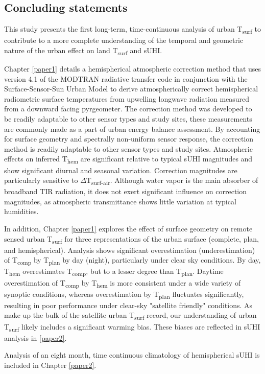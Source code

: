 \begin{bibunit}

\rhead{\thepage}

\chapter{Concluding statements}

This study presents the first long-term, time-continuous analysis of urban T\textsubscript{surf} to contribute to a more complete understanding of the temporal and geometric nature of the urban effect on land T\textsubscript{surf} and sUHI. 

Chapter \ref{paper1} details a hemispherical atmospheric correction method that uses version 4.1 of the MODTRAN radiative transfer code \citep{Berk1987} in conjunction with the Surface-Sensor-Sun Urban Model \citep{Soux2004} to derive atmospherically correct hemispherical radiometric surface temperatures from upwelling longwave radiation measured from a downward facing pyrgeometer. The correction method was developed to be readily adaptable to other sensor types and study sites, these measurements are commonly made as a part of urban energy balance assessment. By accounting for surface geometry and spectrally non-uniform sensor response, the correction method is readily adaptable to other sensor types and study sites. Atmospheric effects on inferred T\textsubscript{hem} are significant relative to typical sUHI magnitudes and show significant diurnal and seasonal variation. Correction magnitudes are particularly sensitive to $\Delta$T\textsubscript{surf-air}. Although water vapor is the main absorber of broadband TIR radiation, it does not exert significant influence on correction magnitudes, as atmospheric transmittance shows little variation at typical humidities. 

In addition, Chapter \ref{paper1} explores the effect of surface geometry on remote sensed urban T\textsubscript{surf} for three representations of the urban surface (complete, plan, and hemispherical). Analysis shows significant overestimation (underestimation) of T\textsubscript{comp} by T\textsubscript{plan} by day (night), particularly under clear sky conditions. By day, T\textsubscript{hem} overestimates T\textsubscript{comp}, but to a lesser degree than T\textsubscript{plan}. Daytime overestimation of T\textsubscript{comp} by T\textsubscript{hem} is more consistent under a wide variety of synoptic conditions, whereas overestimation by T\textsubscript{plan} fluctuates significantly, resulting in poor performance under clear-sky "satellite friendly" conditions. As make up the bulk of the satellite urban T\textsubscript{surf} record, our understanding of urban T\textsubscript{surf} likely includes a significant warming bias. These biases are reflected in sUHI analysis in \ref{paper2}.

Analysis of an eight month, time continuous climatology of hemispherical sUHI is included in Chapter \ref{paper2}.

\cleardoublepage 
{}  
\renewcommand*{\bibname}{References}


\putbib
\end{bibunit}